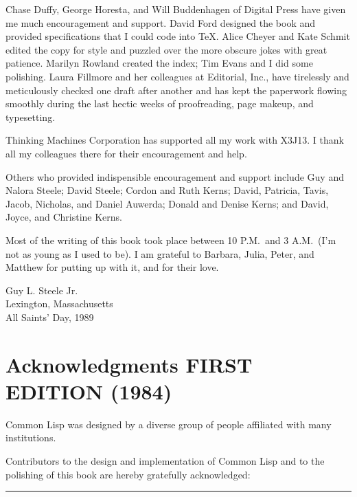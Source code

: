 Chase Duffy, George Horesta, and Will Buddenhagen of Digital Press have given me
much encouragement and support.  David Ford designed the book and
provided specifications that I could code into \TeX.
Alice Cheyer and Kate Schmit edited the copy for style
and puzzled over the more obscure jokes with great patience.
Marilyn Rowland created the index; Tim Evans and I did some polishing.
Laura Fillmore and her colleagues at Editorial, Inc., have
tirelessly and meticulously checked one draft after another and
has kept the paperwork flowing smoothly during the last hectic weeks
of proofreading, page makeup, and typesetting.

Thinking Machines Corporation has supported all my work with X3J13.
I thank all my colleagues there for their encouragement and help.

Others who provided indispensible encouragement and support include
Guy and Nalora Steele; David Steele; Cordon and Ruth Kerns;
David, Patricia, Tavis, Jacob, Nicholas, and Daniel Auwerda;
Donald and Denise Kerns; and David, Joyce, and Christine Kerns.

Most of the writing of this book took place between
10 P.M.~and 3 A.M.~(I'm not as young as I used to be).
I am grateful to Barbara,
Julia, Peter, and Matthew for putting up with it, and for their love.

\begin{tabbing}
Guy L. Steele Jr. \\
Lexington, Massachusetts \\
All Saints' Day, 1989
\end{tabbing}


\chapter*{Acknowledgments FIRST EDITION (1984)}

Common Lisp was designed
by a diverse group of people affiliated with many institutions.


Contributors to the
design and implementation of Common Lisp and to the polishing of this book
are hereby gratefully acknowledged:
\hrule width 0pt\relax

